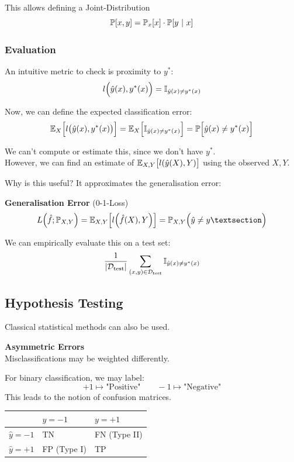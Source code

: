 This allows defining a Joint-Distribution 
$$
    \mathbb{P}[x,y] = \mathbb{P}_x[x]\cdot\mathbb{P}[y \ |\  x]
$$

\subsubsection{Evaluation}

An intuitive metric to check is proximity to $y^*$:\\
$$
    l\Bigl( \hat{y}(x),y^*(x) \Bigr) = \mathbb{I}_{\hat{y}(x)\neq y^*(x)}
$$

Now, we can define the expected classification error:\\
$$
    \mathbb{E}_X\Bigl[ l\bigl( \hat{y}(x), y^*(x) \bigr) \Bigr] = \mathbb{E}_X\Bigl[ \mathbb{I}_{\hat{y}(x) \neq y^*(x)} \Bigr] = \mathbb{P}\Bigl[ \hat{y}(x) \neq y^*(x) \Bigr]
$$

We can't compute or estimate this, since we don't have $y^*$. \\
However, we can find an estimate of $\mathbb{E}_{X,Y}\bigl[ l(\hat{y}(X),Y) \bigr]$ using the observed $X,Y$.

Why is this useful? It approximates the generalisation error:

 \textbf{Generalisation Error} (0-1-Loss)
$$
    L\Bigl( \hat{f};\P_{X,Y} \Bigr) = \E_{X,Y}\Bigl[ l\Bigl( \hat{f}(X),Y \Bigr) \Bigr] = \P_{X,Y}\Bigl( \hat{y}\neq y§ \Bigr)
$$

We can empirically evaluate this on a test set:
$$
    \frac{1}{|\mathcal{D}_\text{test}|} \sum_{(x,y)\in\mathcal{D}_\text{test}} \mathbb{I}_{\hat{y}(x)\neq y^*(x)}
$$

\newpage

\subsection{Hypothesis Testing}
Classical statistical methods can also be used.

 \textbf{Asymmetric Errors}\\
Misclassifications may be weighted differently.\\

For binary classification, we may label:
$$
    +1 \mapsto \text{"Positive"} \qquad -1 \mapsto \text{"Negative"}
$$
This leads to the notion of confusion matrices.

\begin{center}
    \begin{tabular}{l|ll}
                        & $y=-1$        & $y=+1$        \\
        \hline
        $\hat{y}= -1$   & TN            & FN (Type II)  \\
        $\hat{y}= +1$   & FP (Type I)   & TP
        
    \end{tabular}
\end{center}

